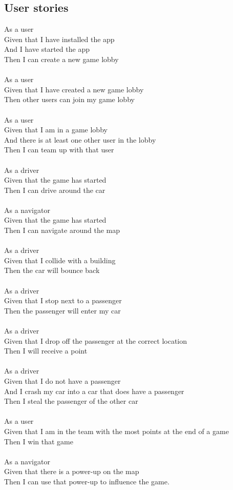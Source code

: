 \documentclass{article}
\begin{document}
\subsection{User stories}
As a user\\
Given that I have installed the app\\
And I have started the app\\
Then I can create a new game lobby\\\\
As a user\\
Given that I have created a new game lobby\\
Then other users can join my game lobby\\\\
As a  user\\
Given that I am in a game lobby\\
And there is at least one other user in the lobby\\
Then I can team up with that user\\\\
As a driver\\
Given that the game has started\\
Then I can drive around the car\\\\
As a navigator\\
Given that the game has started\\
Then I can navigate around the map\\\\
As a driver\\
Given that I collide with a building\\
Then the car will bounce back\\\\
As a driver\\
Given that I stop next to a passenger\\
Then the passenger will enter my car\\\\
As a driver\\
Given that I drop off the passenger at the correct location\\
Then I will receive a point\\\\
As a driver\\
Given that I do not have a passenger\\
And I crash my car into a car that does have a passenger\\
Then I steal the passenger of the other car\\\\
As a user\\
Given that I am in the team with the most points at the end of a game\\
Then I win that game\\\\
As a navigator\\
Given that there is a power-up on the map\\
Then I can use that power-up to influence the game.\\\\
\end{document}
